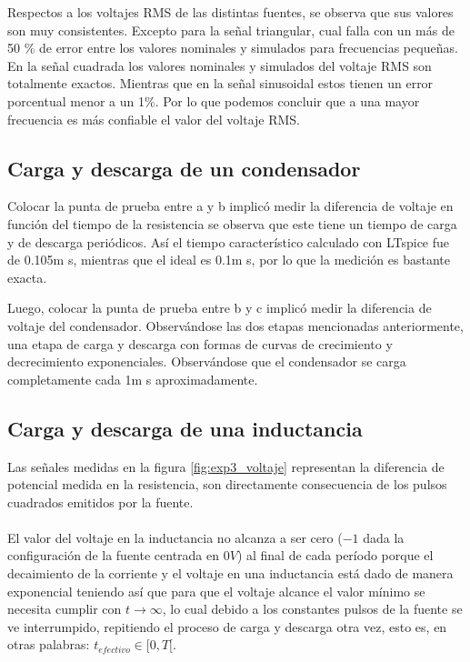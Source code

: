 \documentclass[letterpaper,11pt]{article} %
\begin{document}
Respectos a los voltajes RMS de las distintas fuentes, se observa que sus valores son muy consistentes. Excepto para la señal triangular, cual falla con un más de 50 \% de error entre los valores nominales y simulados para frecuencias pequeñas. En la señal cuadrada los valores nominales y simulados del voltaje RMS son totalmente exactos. Mientras que en la señal sinusoidal estos tienen un error porcentual menor a un 1\%. Por lo que podemos concluir que a una mayor frecuencia es más confiable el valor del voltaje RMS.



\subsection{Carga y descarga de un condensador}
Colocar la punta de prueba entre a y b implicó medir la diferencia de voltaje en función del tiempo de la resistencia se observa que este tiene un tiempo de carga y de descarga periódicos. Así el tiempo característico calculado con LTspice fue de 0.105m s, mientras que el ideal es 0.1m s, por lo que la medición es bastante exacta. 

Luego, colocar la punta de prueba entre b y c implicó medir la diferencia de voltaje del condensador. Observándose las dos etapas mencionadas anteriormente, una etapa de carga y descarga con formas de curvas de crecimiento y decrecimiento exponenciales. Observándose que el condensador se carga completamente cada 1m s aproximadamente.


\subsection{Carga y descarga de una inductancia}
Las señales medidas en la figura \ref{fig:exp3_voltaje} representan la diferencia de potencial medida en la resistencia, son directamente consecuencia de los pulsos cuadrados emitidos por la fuente.\\
\\
El valor del voltaje en la inductancia no alcanza a ser cero ($-1$ dada la configuración de la fuente centrada en $0V$) al final de cada período porque el decaimiento de la corriente y el voltaje en una inductancia está dado de manera exponencial teniendo así que para que el voltaje alcance el valor mínimo se necesita cumplir con $t\rightarrow\infty$, lo cual debido a los constantes pulsos de la fuente se ve interrumpido, repitiendo el proceso de carga y descarga otra vez, esto es, en otras palabras: $t_{efectivo} \in [0,T[$.
\end{document}
